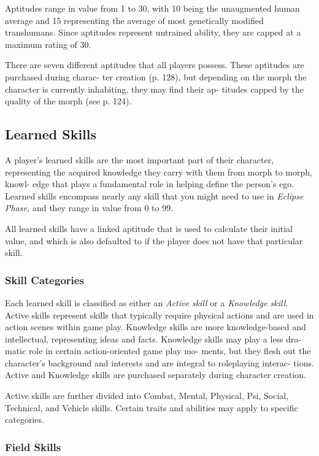 Aptitudes range in value from 1 to 30, with 10 being 
the unaugmented human average and 15 representing 
the average of most genetically modified transhumans\textit{.}
Since aptitudes represent untrained ability, they are 
capped at a maximum rating of 30.

There are seven different aptitudes that all players 
possess. These aptitudes are purchased during charac-
ter creation (p. 128), but depending on the morph the 
character is currently inhabiting, they may find their ap-
titudes capped by the quality of the morph (see p. 124).

\subsection{Learned Skills}

A player's learned skills are the most important part of 
their character, representing the acquired knowledge 
they carry with them from morph to morph, knowl-
edge that plays a fundamental role in helping define 
the person's ego. Learned skills encompass nearly any 
skill that you might need to use in \textit{Eclipse Phase,} and 
they range in value from 0 to 99.

All learned skills have a linked aptitude that is 
used to calculate their initial value, and which is 
also defaulted to if the player does not have that 
particular skill.

\subsubsection{Skill Categories}

Each learned skill is classified as either an \textit{Active skill}
or a \textit{Knowledge skill.} Active skills represent skills 
that typically require physical actions and are used in 
action scenes within game play. Knowledge skills are 
more knowledge-based and intellectual, representing 
ideas and facts. Knowledge skills may play a less dra-
matic role in certain action-oriented game play mo-
ments, but they flesh out the character's background 
and interests and are integral to roleplaying interac-
tions. Active and Knowledge skills are purchased 
separately during character creation.

Active skills are further divided into Combat, 
Mental, Physical, Psi, Social, Technical, and Vehicle 
skills. Certain traits and abilities may apply to specific 
categories.

\subsubsection{Field Skills}

